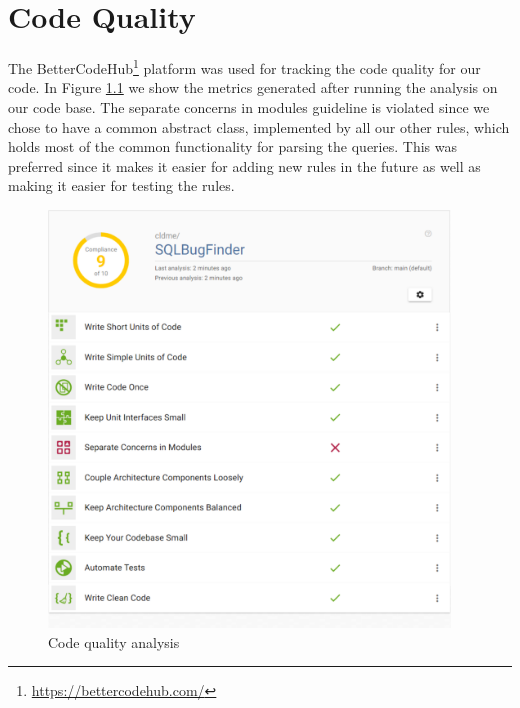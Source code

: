 \chapter{Code Quality}
\label{appendix:code_quality}

The BetterCodeHub\footnote{\url{https://bettercodehub.com/}} platform was used for tracking the code quality for our code. In Figure \ref{fig:code_quality} we show the metrics generated after running the analysis on our code base. The separate concerns in modules guideline is violated since we chose to have a common abstract class, implemented by all our other rules, which holds most of the common functionality for parsing the queries. This was preferred since it makes it easier for adding new rules in the future as well as making it easier for testing the rules.

\begin{figure}[ht]
    \centering
    \includegraphics[width=0.95\textwidth]{img/code_hub.pdf}
    \caption{Code quality analysis}
    \label{fig:code_quality}
\end{figure}